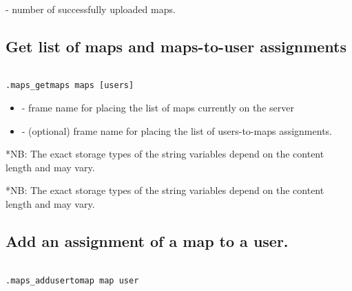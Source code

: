 \savedres
\begin{compactitem}
    \item {} - number of successfully uploaded maps.
\end{compactitem}



\subsection{Get list of maps and maps-to-user assignments}
\begin{lstlisting}[style=CommandLineStyle, showlines=true]

.maps_getmaps maps [users]

\end{lstlisting}

\paramsheader
\begin{itemize}
  \item {} - frame name for placing the list of maps currently on the server
  \item {} - (optional) frame name for placing the list of users-to-maps assignments.
\end{itemize}

\begin{compactitem}
\end{compactitem}

*NB: The exact storage types of the string variables depend on the content
     length and may vary.

\begin{compactitem}
\end{compactitem}

*NB: The exact storage types of the string variables depend on the content
     length and may vary.


\subsection{Add an assignment of a map to a user.}
\begin{lstlisting}[style=CommandLineStyle, showlines=true]

.maps_addusertomap map user

\end{lstlisting}

